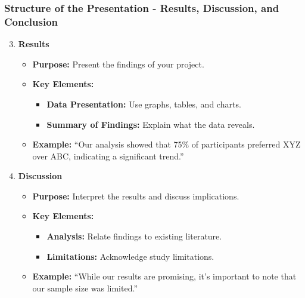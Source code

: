 \documentclass{beamer}
\begin{document}
\begin{frame}[fragile]
    \frametitle{Structure of the Presentation - Results, Discussion, and Conclusion}

    \begin{enumerate}
        \setcounter{enumi}{2} %
        \item \textbf{Results}
            \begin{itemize}
                \item \textbf{Purpose:} Present the findings of your project.
                \item \textbf{Key Elements:}
                    \begin{itemize}
                        \item \textbf{Data Presentation:} Use graphs, tables, and charts. 
                        \item \textbf{Summary of Findings:} Explain what the data reveals.
                    \end{itemize}
                \item \textbf{Example:} 
                    “Our analysis showed that 75\% of participants preferred XYZ over ABC, indicating a significant trend.”
            \end{itemize}

        \item \textbf{Discussion}
            \begin{itemize}
                \item \textbf{Purpose:} Interpret the results and discuss implications.
                \item \textbf{Key Elements:}
                    \begin{itemize}
                        \item \textbf{Analysis:} Relate findings to existing literature.
                        \item \textbf{Limitations:} Acknowledge study limitations.
                    \end{itemize}
                \item \textbf{Example:} 
                    “While our results are promising, it’s important to note that our sample size was limited.”
            \end{itemize}


\end{enumerate}
\end{frame}
\end{document}
